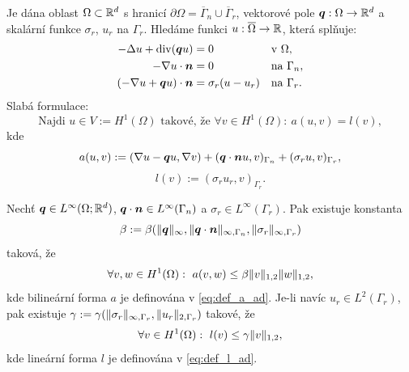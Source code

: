 Je dána oblast $\Omega\subset\mathbb R^d$ s hranicí $\partial\Omega=\overline\Gamma_n\cup\overline\Gamma_r$, vektorové pole $\mathbf{\boldsymbol{q}}:\Omega\rightarrow\mathbb R^d$ a skalární funkce $\sigma_r$, $u_r$ na $\Gamma_r$.
Hledáme funkci $u:\overline\Omega\rightarrow\mathbb R$, která splňuje:
\[ \begin{aligned}
-\Delta u + \operatorname{div}(\mathbf{\boldsymbol{q}} u) &= 0 &&\text{v }\Omega,\\
-\nabla u \cdot \mathbf{\boldsymbol{n}} &= 0 &&\text{na }\Gamma_n,\\
(-\nabla u + \mathbf{\boldsymbol{q}} u) \cdot \mathbf{\boldsymbol{n}} &= \sigma_r(u - u_r) &&\text{na }\Gamma_r.
\end{aligned} \]
Slabá formulace:
\[ \mbox{Najdi }u\in V:=H^1(\Omega) \mbox{ takové, že }\forall v\in H^1(\Omega):~a(u,v)=l(v), \]
kde
\begin{equation}\label{eq:def_a_ad}
a(u,v) := (\nabla u-\mathbf{\boldsymbol{q}} u, \nabla v) + (\mathbf{\boldsymbol{q}}\cdot\mathbf{\boldsymbol{n}} u,v)_{\Gamma_n} + (\sigma_r u, v)_{\Gamma_r},
\end{equation}
\begin{equation}\label{eq:def_l_ad}
l(v) := (\sigma_r u_r, v)_{\Gamma_r}.
\end{equation}
% 
\begin{veta}
Nechť $\mathbf{\boldsymbol{q}}\in L^\infty(\Omega;\mathbb R^d)$, $\mathbf{\boldsymbol{q}}\cdot\mathbf{\boldsymbol{n}}\in L^\infty(\Gamma_n)$ a $\sigma_r\in L^\infty(\Gamma_r)$. 
Pak existuje konstanta 
\[
    \beta:=\beta(\|\mathbf{\boldsymbol{q}}\|_\infty,\|\mathbf{\boldsymbol{q}}\cdot\mathbf{\boldsymbol{n}}\|_{\infty,\Gamma_n},\|\sigma_r\|_{\infty,\Gamma_r})
\]
taková, že
\[ 
    \forall v,w\in H^1(\Omega):~a(v,w) \le \beta \|v\|_{1,2}\|w\|_{1,2}, 
\]
kde bilineární forma $a$ je definována v \eqref{eq:def_a_ad}.
Je-li navíc $u_r\in L^2(\Gamma_r)$, pak existuje $\gamma:=\gamma(\|\sigma_r\|_{\infty,\Gamma_r},\|u_r\|_{2,\Gamma_r})$ takové, že
\[ 
    \forall v\in H^1(\Omega):~l(v) \le \gamma\|v\|_{1,2}, 
\]
kde lineární forma $l$ je definována v \eqref{eq:def_l_ad}.
\end{veta}
